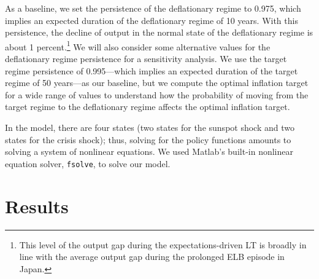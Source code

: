 \documentclass[11pt]{article}
\begin{document}
	As a baseline, we set the persistence of the deflationary regime to 0.975, which implies an expected duration of the deflationary regime of 10 years. With this persistence, the decline of output in the normal state of the deflationary regime is about 1 percent.\footnote{This level of the output gap during the expectations-driven LT is broadly in line with the average output gap during the prolonged ELB episode in Japan.} We will also consider some alternative values for the deflationary regime persistence for a sensitivity analysis. We use the target regime persistence of 0.995---which implies an expected duration of the target regime of 50 years---as our baseline, but we compute the optimal inflation target for a wide range of values to understand how the probability of moving from the target regime to the deflationary regime affects the optimal inflation target. 
	
	In the model, there are four states (two states for the sunspot shock and two states for the crisis shock); thus, solving for the policy functions amounts to solving a system of nonlinear equations. We used Matlab's built-in nonlinear equation solver, \texttt{fsolve}, to solve our model.
	
	
	\section{Results}
	\label{S:StylizedResults}
	
\end{document}
